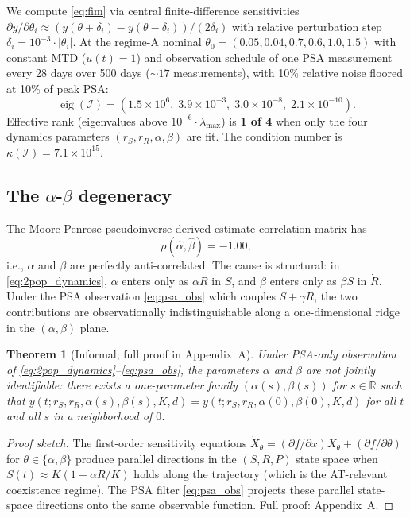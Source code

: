 \documentclass[11pt]{article}
\newtheorem{theorem}{Theorem}
\newcommand{\R}{\mathbb{R}}
\begin{document}
We compute \eqref{eq:fim} via central finite-difference sensitivities
$\partial y / \partial \theta_i \approx (y(\theta + \delta_i) - y(\theta - \delta_i))/(2\delta_i)$
with relative perturbation step $\delta_i = 10^{-3} \cdot |\theta_i|$. At the
regime-A nominal $\theta_0 = (0.05, 0.04, 0.7, 0.6, 1.0, 1.5)$ with constant MTD
($u(t) = 1$) and observation schedule of one PSA measurement every 28 days over
500 days ($\sim 17$ measurements), with 10\% relative noise floored at 10\% of
peak PSA:
\begin{equation}
\operatorname{eig}(\mathcal{I}) = (1.5 \times 10^6,\; 3.9 \times 10^{-3},\;
3.0 \times 10^{-8},\; 2.1 \times 10^{-10}).
\label{eq:eig_2pop}
\end{equation}
Effective rank (eigenvalues above $10^{-6} \cdot \lambda_\text{max}$) is
\textbf{1 of 4} when only the four dynamics parameters
$(r_S, r_R, \alpha, \beta)$ are fit. The condition number is
$\kappa(\mathcal{I}) = 7.1 \times 10^{15}$.

\subsection{The $\alpha$-$\beta$ degeneracy}

The Moore-Penrose-pseudoinverse-derived estimate correlation matrix has
\begin{equation}
\rho(\hat{\alpha}, \hat{\beta}) = -1.00,
\label{eq:alpha_beta_corr}
\end{equation}
i.e., $\alpha$ and $\beta$ are perfectly anti-correlated. The cause is structural:
in \eqref{eq:2pop_dynamics}, $\alpha$ enters only as $\alpha R$ in $\dot{S}$, and
$\beta$ enters only as $\beta S$ in $\dot{R}$. Under the PSA observation
\eqref{eq:psa_obs} which couples $S + \gamma R$, the two contributions are
observationally indistinguishable along a one-dimensional ridge in the
$(\alpha, \beta)$ plane.

\begin{theorem}[Informal; full proof in Appendix~A]\label{thm:rank1}
Under PSA-only observation of \eqref{eq:2pop_dynamics}--\eqref{eq:psa_obs}, the
parameters $\alpha$ and $\beta$ are not jointly identifiable: there exists a
one-parameter family $(\alpha(s), \beta(s))$ for $s \in \R$ such that
$y(t; r_S, r_R, \alpha(s), \beta(s), K, d) = y(t; r_S, r_R, \alpha(0), \beta(0), K, d)$
for all $t$ and all $s$ in a neighborhood of $0$.
\end{theorem}

\begin{proof}[Proof sketch]
The first-order sensitivity equations
$\dot{X}_\theta = (\partial f/\partial x) X_\theta + (\partial f/\partial \theta)$
for $\theta \in \{\alpha, \beta\}$ produce parallel directions in the $(S, R, P)$
state space when $S(t) \approx K(1 - \alpha R/K)$ holds along the trajectory
(which is the AT-relevant coexistence regime). The PSA filter \eqref{eq:psa_obs}
projects these parallel state-space directions onto the same observable
function. Full proof: Appendix~A.
\end{proof}
\end{document}
